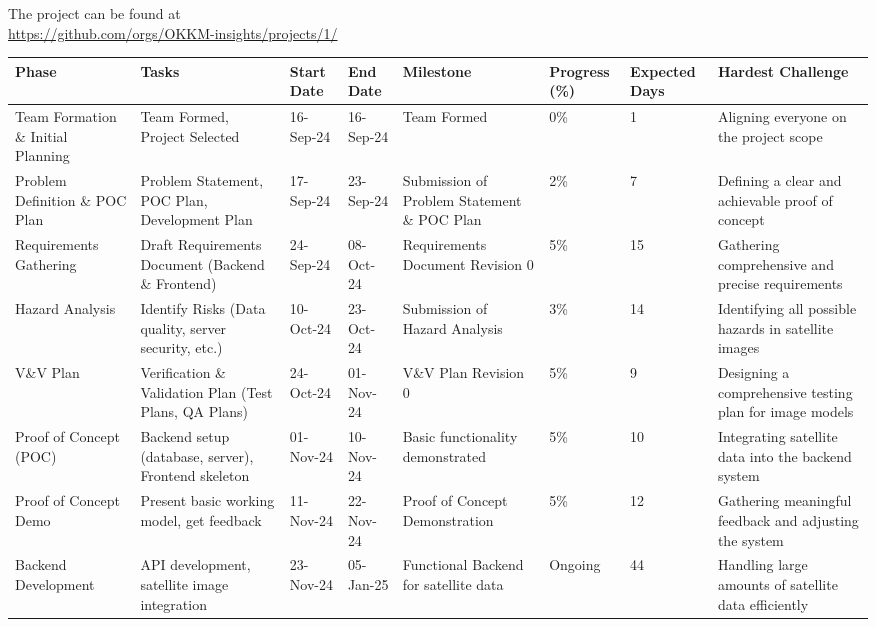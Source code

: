 \documentclass{article}
\begin{document}
The project can be found at \\\url{https://github.com/orgs/OKKM-insights/projects/1/}

\begin{table}[h!]
  \centering
  \setlength{\arrayrulewidth}{1pt}
  \begin{adjustbox}{max width=\textwidth}
  \begin{tabular}{|p{3cm}|p{5cm}|p{2.5cm}|p{2.5cm}|p{4cm}|p{2cm}|p{2.5cm}|p{4cm}|}
  \hline
  \rowcolor{headerblue}
  \textbf{\color{white}Phase} & \textbf{\color{white}Tasks} & \textbf{\color{white}Start Date} & \textbf{\color{white}End Date} & \textbf{\color{white}Milestone} & \textbf{\color{white}Progress (\%)} & \textbf{\color{white}Expected Days} & \textbf{\color{white}Hardest Challenge} \\ \hline
  Team Formation \& Initial Planning & Team Formed, Project Selected & 16-Sep-24 & 16-Sep-24 & Team Formed & 0\% & 1 & Aligning everyone on the project scope \\ \hline
  Problem Definition \& POC Plan & Problem Statement, POC Plan, Development Plan & 17-Sep-24 & 23-Sep-24 & Submission of Problem Statement \& POC Plan & 2\% & 7 & Defining a clear and achievable proof of concept \\ \hline
  Requirements Gathering & Draft Requirements Document (Backend \& Frontend) & 24-Sep-24 & 08-Oct-24 & Requirements Document Revision 0 & 5\% & 15 & Gathering comprehensive and precise requirements \\ \hline
  Hazard Analysis & Identify Risks (Data quality, server security, etc.) & 10-Oct-24 & 23-Oct-24 & Submission of Hazard Analysis & 3\% & 14 & Identifying all possible hazards in satellite images \\ \hline
  V\&V Plan & Verification \& Validation Plan (Test Plans, QA Plans) & 24-Oct-24 & 01-Nov-24 & V\&V Plan Revision 0 & 5\% & 9 & Designing a comprehensive testing plan for image models \\ \hline
  Proof of Concept (POC) & Backend setup (database, server), Frontend skeleton & 01-Nov-24 & 10-Nov-24 & Basic functionality demonstrated & 5\% & 10 & Integrating satellite data into the backend system \\ \hline
  Proof of Concept Demo & Present basic working model, get feedback & 11-Nov-24 & 22-Nov-24 & Proof of Concept Demonstration & 5\% & 12 & Gathering meaningful feedback and adjusting the system \\ \hline
  Backend Development & API development, satellite image integration & 23-Nov-24 & 05-Jan-25 & Functional Backend for satellite data & Ongoing & 44 & Handling large amounts of satellite data efficiently \\ \hline

\end{tabular}
\end{adjustbox}
\end{table}
\end{document}

